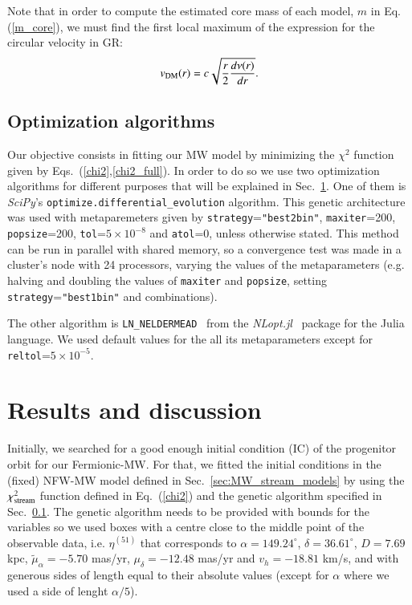 \documentclass[twocolumn]{aa}
\begin{document}
Note that in order to compute the estimated core mass of each model, $m$ in Eq.(\ref{m_core}),
we must find the first local maximum of the expression for the circular velocity in GR:
\begin{equation}
   \label{v_circ_dm}
   v_{\rm{DM}}(r)= c\sqrt{\frac{r}{2}\frac{d\nu(r)}{dr}}.
\end{equation}

\subsection{Optimization algorithms}
\label{sec:optimization}

Our objective consists in fitting our MW model by minimizing the $\chi^2$ function given by Eqs.~(\ref{chi2},\ref{chi2_full}).  In order to do so we use two optimization algorithms for different purposes
that will be explained in Sec.~\ref{sec:results}.
One of them is {\it SciPy}'s
\texttt{optimize.differential\_evolution} algorithm. This genetic architecture
was used with metaparemeters given by
\texttt{strategy}=\texttt{"best2bin"}, \texttt{maxiter}=200, \texttt{popsize}=200,
\texttt{tol}=$5\times10^{-8}$ and \texttt{atol}=0, unless otherwise stated. This method can be run in parallel with shared memory,
so a convergence test was made in a cluster's node with 24 processors, varying the values of the metaparameters (e.g. halving and doubling the values of \texttt{maxiter} and \texttt{popsize}, setting \texttt{strategy}=\texttt{"best1bin"} and combinations).

The other algorithm is \texttt{LN\_NELDERMEAD}~\citep{NELDERMEAD,10.1093/comjnl/8.1.42,shere} from the
{\it NLopt.jl}~\citep{NLopt} package
for the {\sc Julia}~\citep{bezanson2017julia} language.
We used default values for the all its metaparameters except for
\texttt{reltol}=$5\times10^{-5}$.



\section{Results and discussion}
\label{sec:results}

Initially, we searched for a good enough initial condition (IC) of the progenitor orbit for our
Fermionic-MW. For that, we fitted the initial conditions in the (fixed) NFW-MW model defined in
Sec.~\ref{sec:MW_stream_models} by using the $\chi^2_{\rm{stream}}$ function defined in Eq.~(\ref{chi2})
and the genetic algorithm specified in Sec.~\ref{sec:optimization}. The genetic algorithm
needs to be provided with bounds for the variables so we used boxes with a centre close to the middle point
of the observable data, i.e. $\eta^{(51)}$ that corresponds to $\alpha=149.24^{\circ}$, $\delta=36.61^{\circ}$, $D=7.69$ kpc, $\tilde{\mu}_\alpha=-5.70$ mas/yr, $\mu_\delta=-12.48$ mas/yr and $v_h=-18.81$ km/s, and with generous sides of length equal to their absolute values (except for $\alpha$ where we used a side of lenght $\alpha/5$).
\end{document}

